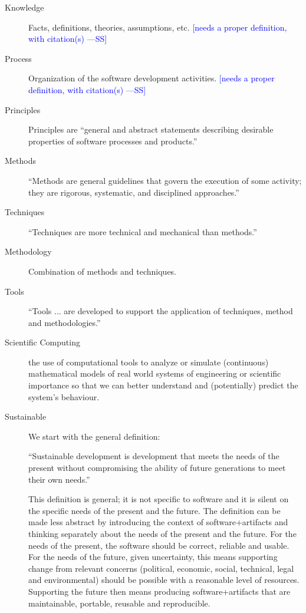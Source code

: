 \documentclass[12pt]{article}
\newcommand{\authornote}[3]{\textcolor{#1}{[#3 ---#2]}}
\newcommand{\authornote}[3]{}
\newcommand{\wss}[1]{\authornote{blue}{SS}{#1}} %
\begin{document}
\begin{description}
\item[Knowledge] Facts, definitions, theories, assumptions, etc. \wss{needs a
    proper definition, with citation(s)}
\item[Process] Organization of the software development activities.  \wss{needs a
    proper definition, with citation(s)}
\item[Principles] Principles are ``general and abstract statements describing
  desirable properties of software processes and products.''  \citep[p.\
  41]{GhezziEtAl2003}
\item[Methods] ``Methods are general guidelines that govern the execution of some activity;
  they are rigorous, systematic, and disciplined approaches.''  \citep[p.\
  41]{GhezziEtAl2003}
\item[Techniques] ``Techniques are more technical and mechanical than methods.''
  \cite[p.\ 41]{GhezziEtAl2003}
\item[Methodology] Combination of methods and techniques.  \citep[p.\
  41]{GhezziEtAl2003}
\item[Tools] ``Tools ... are developed to support the application of techniques,
  method and methodologies.'' \cite[p.\ 41]{GhezziEtAl2003}

\item[Scientific Computing] the use of computational tools to analyze or
  simulate (continuous) mathematical models of real world systems of engineering
  or scientific importance so that we can better understand and (potentially)
  predict the system's behaviour. \citep{SmithAndLai2005}
\item[Sustainable] We start with the general definition:

``Sustainable development is development that meets the needs
  of the present without compromising the ability of future generations to meet
  their own needs.'' \citep{Brundtland1987}

  This definition is general; it is not specific to software and it is silent on
  the specific needs of the present and the future.  The definition can be made
  less abstract by introducing the context of software+artifacts and thinking
  separately about the needs of the present and the future.  For the needs of
  the present, the software should be correct, reliable and usable. For the
  needs of the future, given uncertainty, this means supporting change from
  relevant concerns (political, economic, social, technical, legal and
  environmental) should be possible with a reasonable level of resources.
  Supporting the future then means producing software+artifacts that are
  maintainable, portable, reusable and reproducible.  


\end{description}
\end{document}
